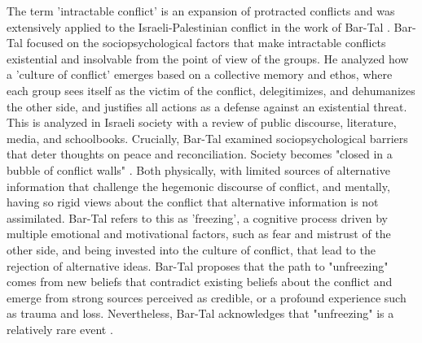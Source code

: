 \documentclass[dissertation,math,vertlayout,pdfa,colorlinks]{aaltoseries}
\begin{document}
The term 'intractable conflict' \cite{kriesbergIntractableConflicts1993} is an expansion of protracted conflicts and was extensively applied to the Israeli-Palestinian conflict in the work of Bar-Tal \cite{bar-talIntractableConflictsSociopsychological2013}. Bar-Tal focused on the sociopsychological factors that make intractable conflicts existential and insolvable from the point of view of the groups. He analyzed how a 'culture of conflict' emerges based on a collective memory and ethos, where each group sees itself as the victim of the conflict, delegitimizes, and dehumanizes the other side, and justifies all actions as a defense against an existential threat. This is analyzed in Israeli society with a review of public discourse, literature, media, and schoolbooks. Crucially, Bar-Tal examined sociopsychological barriers that deter thoughts on peace and reconciliation. Society becomes "closed in a bubble of conflict walls" \cite[p. 281]{bar-talIntractableConflictsSociopsychological2013}. Both physically, with limited sources of alternative information that challenge the hegemonic discourse of conflict, and mentally, having so rigid views about the conflict that alternative information is not assimilated. Bar-Tal refers to this as 'freezing', a cognitive process driven by multiple emotional and motivational factors, such as fear and mistrust of the other side, and being invested into the culture of conflict, that lead to the rejection of alternative ideas. Bar-Tal proposes that the path to "unfreezing" comes from new beliefs that contradict existing beliefs about the conflict and emerge from strong sources perceived as credible, or a profound experience such as trauma and loss. Nevertheless, Bar-Tal acknowledges that "unfreezing" is a relatively rare event \cite[p. 289]{bar-talIntractableConflictsSociopsychological2013}. 
\end{document}
